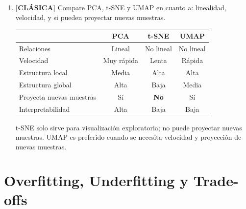 \documentclass[11pt,a4paper]{article}
\begin{document}
\begin{enumerate}[label=\textbf{P\arabic*.}, resume]
\begin{answerbox}
La varianza explicada por la componente $j$ es:
\[
  \text{VE}_j = \frac{\lambda_j}{\sum_{l=1}^p \lambda_l}
\]
Para elegir $k$ (n\'umero de componentes a retener) se usa el \textbf{Scree Plot}: se
busca el $k$ donde la varianza acumulada supera un umbral deseado (t\'ipicamente
85--95\%), o donde la curva muestra un ``codo''.
\end{answerbox}

\item \leavevmode

\begin{classicbox}
\textcolor{tdred}{\textbf{[CL\'ASICA]}} Compare PCA, t-SNE y UMAP en cuanto a:
linealidad, velocidad, y si pueden proyectar nuevas muestras.
\end{classicbox}

\begin{answerbox}
\begin{center}
\begin{tabular}{lccc}
\toprule
& \textbf{PCA} & \textbf{t-SNE} & \textbf{UMAP}\\
\midrule
Relaciones & Lineal & No lineal & No lineal\\
Velocidad & Muy r\'apida & Lenta & R\'apida\\
Estructura local & Media & Alta & Alta\\
Estructura global & Alta & Baja & Media\\
Proyecta nuevas muestras & S\'i & \textbf{No} & S\'i\\
Interpretabilidad & Alta & Baja & Baja\\
\bottomrule
\end{tabular}
\end{center}
t-SNE solo sirve para visualizaci\'on exploratoria; no puede proyectar nuevas muestras.
UMAP es preferido cuando se necesita velocidad y proyecci\'on de nuevas muestras.
\end{answerbox}

\end{enumerate}

\section{Overfitting, Underfitting y Trade-offs}
\end{document}
